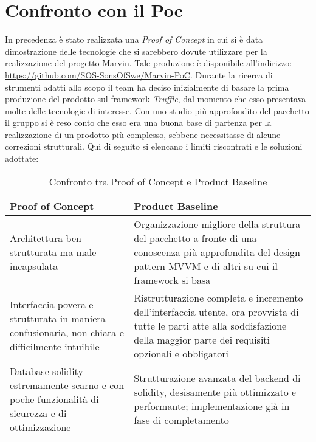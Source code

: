 \section{Confronto con il Poc}
In precedenza è stato realizzata una \emph{Proof of Concept} in cui si è data dimostrazione delle tecnologie che si sarebbero dovute utilizzare per la realizzazione del progetto Marvin.
Tale produzione è disponibile all'indirizzo: \url{https://github.com/SOS-SonsOfSwe/Marvin-PoC}.
Durante la ricerca di strumenti adatti allo scopo il team ha deciso inizialmente di basare la prima produzione del prodotto sul framework \emph{Truffle}, dal momento che esso presentava molte delle tecnologie di interesse.
Con uno studio più approfondito del pacchetto il gruppo si è reso conto che esso era una buona base di partenza per la realizzazione di un prodotto più complesso, sebbene necessitasse di alcune correzioni strutturali. Qui di seguito si elencano i limiti riscontrati e le soluzioni adottate:
\newline
\newline

\begin{table}[hp]
	\centering
\begin{tabular}{|p{6cm}|p{6cm}|}
	\hline
	\textbf{Proof of Concept} & \textbf{Product Baseline} \\
	
	\hline Architettura ben strutturata ma male incapsulata
	&
	Organizzazione migliore della struttura del pacchetto
	a fronte di una conoscenza più approfondita del design pattern MVVM e di altri su cui il framework si basa \\ 
	
	\hline Interfaccia povera e strutturata in maniera confusionaria, non chiara e  difficilmente intuibile 
	&
	Ristrutturazione completa e incremento dell'interfaccia utente, ora provvista di tutte le parti atte alla soddisfazione della maggior parte dei requisiti opzionali e obbligatori \\ 
	
	\hline Database solidity estremamente scarno e con poche funzionalità di sicurezza e di ottimizzazione
	&
	Strutturazione avanzata del backend di solidity, desisamente più ottimizzato e performante; implementazione già in fase di completamento\\
	
	\hline
\end{tabular}
\caption{Confronto tra Proof of Concept e Product Baseline}
\end{table}